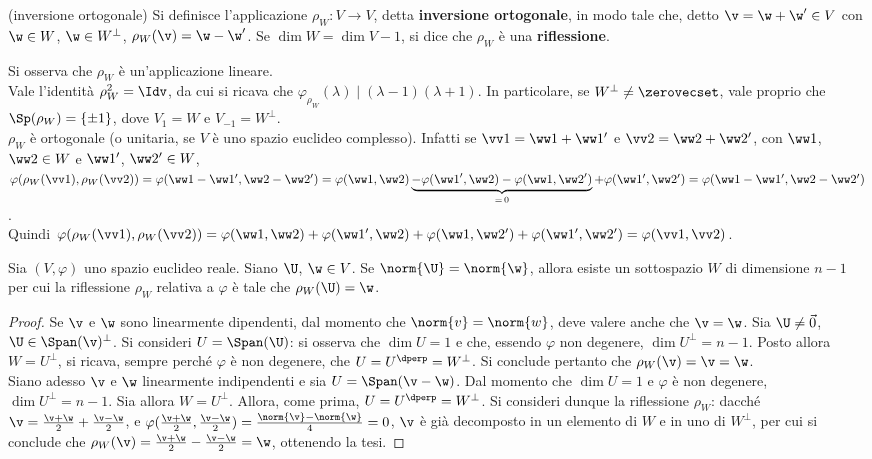 \begin{definition} (inversione ortogonale)
	Si definisce l'applicazione $\rho_W : V \to V$, detta \textbf{inversione ortogonale}, in modo tale che, detto $\v = \w + \w' \in V$ con $\w \in W$, $\w \in W^\perp$, $\rho_W(\v) = \w - \w'$. Se $\dim W = \dim V - 1$,
	si dice che $\rho_W$ è una \textbf{riflessione}.
\end{definition}

\begin{remark}\nl
	\li Si osserva che $\rho_W$ è un'applicazione lineare. \\
	\li Vale l'identità $\rho_W^2 = \Idv$, da cui si ricava che $\varphi_{\rho_W}(\lambda) \mid (\lambda-1)(\lambda+1)$. In particolare, se $W^\perp \neq \zerovecset$, vale proprio
	che $\Sp(\rho_W) = \{\pm1\}$, dove $V_1 = W$ e $V_{-1} = W^\perp$. \\
	\li $\rho_W$ è ortogonale (o unitaria, se $V$ è uno spazio euclideo complesso). Infatti se $\vv 1 = \ww 1 + \ww 1'$ e $\vv 2 = \ww 2 + \ww 2 '$, con $\ww 1$, $\ww 2 \in W$ e $\ww 1'$, $\ww 2' \in W$, $\varphi(\rho_W(\vv 1), \rho_W(\vv 2)) = \varphi(\ww 1 - \ww 1', \ww 2 - \ww 2') = \varphi(\ww 1, \ww 2) \underbrace{- \varphi(\ww 1', \ww 2) - \varphi(\ww 1, \ww 2')}_{=\,0} + \varphi(\ww 1', \ww 2') =  \varphi(\ww 1 - \ww 1', \ww 2 - \ww 2')$. \\
	
	Quindi $\varphi(\rho_W(\vv 1), \rho_W(\vv 2)) = \varphi(\ww 1, \ww 2) + \varphi(\ww 1', \ww 2) + \varphi(\ww 1, \ww 2') + \varphi(\ww 1', \ww 2') = \varphi(\vv 1, \vv 2)$.
\end{remark}

\begin{lemma} Sia $(V, \varphi)$ uno spazio euclideo reale.
	Siano $\U$, $\w \in V$. Se $\norm{\U} = \norm{\w}$, allora esiste un sottospazio $W$ di dimensione
	$n-1$ per cui la riflessione $\rho_W$ relativa a $\varphi$ è tale che $\rho_W(\U) = \w$.
\end{lemma}

\begin{proof} Se $\v$ e $\w$ sono linearmente dipendenti, dal momento che $\norm{v} = \norm{w}$, deve valere anche
	che $\v = \w$. Sia $\U \neq \vec 0$, $\U \in \Span(\v)^\perp$. Si consideri $U = \Span(\U)$: si osserva che
	$\dim U = 1$ e che, essendo $\varphi$ non degenere, $\dim U^\perp = n-1$. Posto allora $W = U^\perp$, si ricava,
	sempre perché $\varphi$ è non degenere, che $U = U^\dperp = W^\perp$. Si conclude pertanto che $\rho_W(\v) =
	\v = \w$. \\
	
	Siano adesso $\v$ e $\w$ linearmente indipendenti e sia $U = \Span(\v - \w)$. Dal momento che $\dim U = 1$ e $\varphi$ è non degenere, $\dim U^\perp = n-1$. Sia allora $W = U^\perp$. Allora, come prima, $U = U^\dperp = W^\perp$. Si consideri dunque la riflessione $\rho_W$: dacché $\v = \frac{\v + \w}{2} + \frac{\v - \w}{2}$, e $\varphi(\frac{\v + \w}{2}, \frac{\v - \w}{2}) = \frac{\norm{\v} - \norm{\w}}{4} = 0$, $\v$ è già decomposto in un elemento di $W$ e in uno di $W^\perp$, per cui si conclude che $\rho_W(\v) =
	\frac{\v + \w}{2} - \frac{\v - \w}{2} = \w$, ottenendo la tesi.
	
\end{proof}

